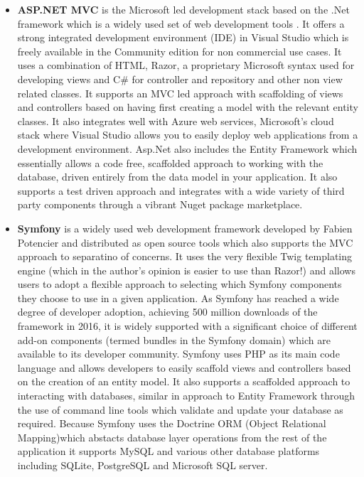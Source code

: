 \documentclass[a4paper,12pt]{article}
\begin{document}
\begin{itemize}
\item \textbf{ASP.NET MVC} is the Microsoft led development stack based on the .Net framework which is a widely used set of web development tools . It offers a strong integrated development environment (IDE) in Visual Studio which is freely available in the Community edition for non commercial use cases. It uses a combination of HTML, Razor, a proprietary Microsoft syntax used for developing views and C\# for controller and repository and other non view related classes. It supports an MVC led approach with  scaffolding of views and controllers based on having first creating a model with the relevant entity classes. It also integrates well with Azure web services, Microsoft's cloud stack where Visual Studio allows you to easily deploy web applications from a development environment. Asp.Net also includes the Entity Framework which essentially allows a code free, scaffolded approach to working with the database, driven entirely from the data model in your application. It also supports a test driven approach and integrates with a wide variety of third party components through a vibrant Nuget package marketplace.
\item \textbf{Symfony} is a widely used web development framework developed by Fabien Potencier and distributed as open source tools which also supports the MVC approach to separatino of concerns. It uses the very flexible Twig templating engine (which in the author's opinion is easier to use than Razor!) and allows users to adopt a flexible approach to selecting which Symfony components they choose to use in a given application. As Symfony has reached a wide degree of developer adoption, achieving 500 million downloads of the framework in 2016, it is widely supported with a significant choice of different add-on components (termed bundles in the Symfony domain) which are available to its developer community. Symfony uses PHP as its main code language and allows developers to easily scaffold views and controllers based on the creation of an entity model. It also supports a scaffolded approach to interacting with databases, similar in approach to Entity Framework through the use of command line tools which validate and update your database as required. Because Symfony uses the Doctrine ORM (Object Relational Mapping)which abstacts database layer operations from the rest of the application it supports MySQL and various other database platforms including SQLite, PostgreSQL and Microsoft SQL server.


\end{itemize}
\end{document}

